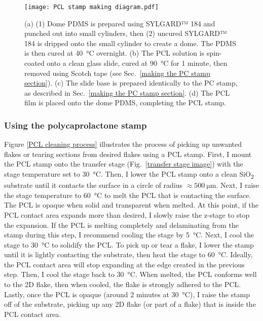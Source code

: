 \documentclass{beavtex_dub_edit}
\begin{document}
\begin{figure}
    \texttt{[image: PCL stamp making diagram.pdf]}
    \caption{(a) (1) Dome PDMS is prepared using SYLGARD™ 184 and punched out into small cylinders, then (2) uncured SYLGARD™ 184 is dripped onto the small cylinder to create a dome. The PDMS is then cured at \SI{40}{\celsius} overnight. (b) The PCL solution is spin-coated onto a clean glass slide, cured at \SI{90}{\celsius} for 1 minute, then removed using Scotch tape (see Sec.\ \ref{making the PC stamp section}). (c) The slide base is prepared identically to the PC stamp, as described in Sec.\ \ref{making the PC stamp section}. (d) The PCL film is placed onto the dome PDMS, completing the PCL stamp.}
    \label{PCL stamp making diagram}
\end{figure}

\subsubsection{Using the polycaprolactone stamp}
Figure \ref{PCL cleaning process} illustrates the process of picking up unwanted flakes or tearing sections from desired flakes using a PCL stamp. First, I mount the PCL stamp onto the transfer stage (Fig.\ \ref{transfer stage image}) with the stage temperature set to \SI{30}{\celsius}. Then, I lower the PCL stamp onto a clean SiO\textsubscript{2} substrate until it contacts the surface in a circle of radius $\approx \SI{500}{\micro\meter}$. Next, I raise the stage temperature to \SI{60}{\celsius} to melt the PCL that is contacting the surface. The PCL is opaque when solid and transparent when melted. At this point, if the PCL contact area expands more than desired, I slowly raise the z-stage to stop the expansion. If the PCL is melting completely and delaminating from the stamp during this step, I recommend cooling the stage by \SI{5}{\celsius}. Next, I cool the stage to \SI{30}{\celsius} to solidify the PCL. To pick up or tear a flake, I lower the stamp until it is lightly contacting the substrate, then heat the stage to \SI{60}{\celsius}. Ideally, the PCL contact area will stop expanding at the edge created in the previous step. Then, I cool the stage back to \SI{30}{\celsius}. When melted, the PCL conforms well to the 2D flake, then when cooled, the flake is strongly adhered to the PCL. Lastly, once the PCL is opaque (around 2 minutes at \SI{30}{\celsius}), I raise the stamp off of the substrate, picking up any 2D flake (or part of a flake) that is inside the PCL contact area.
\end{document}
